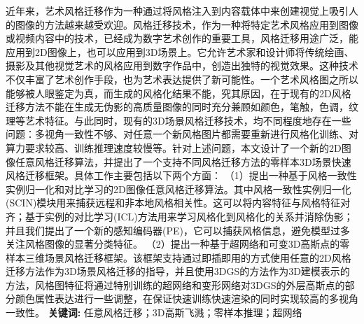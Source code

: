 \cleardoublepage
{}

\setlength{\parindent}{2em} 
近年来，艺术风格迁移作为一种通过将风格注入到内容载体中来创建视觉上吸引人的图像的方法越来越受欢迎。风格迁移技术，作为一种将特定艺术风格应用到图像或视频内容中的技术，已经成为数字艺术创作的重要工具，风格迁移用途广泛，能应用到2D图像上，也可以应用到3D场景上。它允许艺术家和设计师将传统绘画、摄影及其他视觉艺术的风格应用到数字作品中，创造出独特的视觉效果。这种技术不仅丰富了艺术创作手段，也为艺术表达提供了新可能性。一个艺术风格图之所以能够被人眼鉴定为真，而生成的风格化结果不能，究其原因，在于现有的2D风格迁移方法不能在生成无伪影的高质量图像的同时充分兼顾如颜色，笔触，色调，纹理等艺术特征。与此同时，现有的3D场景风格迁移技术，均不同程度地存在一些问题：多视角一致性不够、对任意一个新风格图片都需要重新进行风格化训练、对算力要求较高、训练推理速度较慢等。针对上述问题，本文设计了一个新的2D图像任意风格迁移算法，并提出了一个支持不同风格迁移方法的零样本3D场景快速风格迁移框架。具体工作主要包括以下两个方面：
\newline \indent（1）提出一种基于风格一致性实例归一化和对比学习的2D图像任意风格迁移算法。其中风格一致性实例归一化 (SCIN)模块用来捕获远程和非本地风格相关性。这可以将内容特征与风格特征对齐；基于实例的对比学习(ICL)方法用来学习风格化到风格化的关系并消除伪影；并且我们提出了一个新的感知编码器(PE)，它可以捕获风格信息，避免模型过多关注风格图像的显著分类特征。   
\newline \indent（2）提出一种基于超网络和可变3D高斯点的零样本三维场景风格迁移框架。该框架支持通过即插即用的方式使用任意的2D风格迁移方法作为3D场景风格迁移的指导，并且使用3DGS的方法作为3D建模表示的方法，风格图特征将通过特别训练的超网络和变形网络对3DGS的外层高斯点的部分颜色属性表达进行一些调整，在保证快速训练快速渲染的同时实现较高的多视角一致性。
\newline
{\textbf{关键词:}}
任意风格迁移；3D高斯飞溅；零样本推理；超网络 

